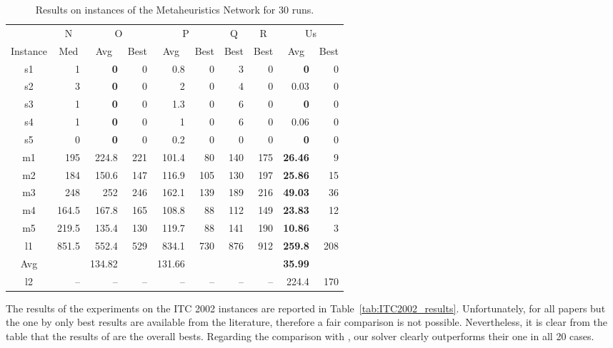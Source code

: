 \documentclass[authoryear,preprint,a4paper,12pt]{elsarticle}
\begin{document}
\begin{table}
\centering
\footnotesize
\begin{tabular}{|c|r|rr|rr|r|r|rr|}\hline
 & \multicolumn{1}{c|}{N} & \multicolumn{ 2}{c|}{O} & \multicolumn{ 2}{c|}{P} & \multicolumn{1}{c|}{Q} & \multicolumn{1}{c|}{R} & \multicolumn{ 2}{c|}{Us} \\ 
Instance & \multicolumn{1}{c|}{Med} & \multicolumn{1}{c}{Avg} & \multicolumn{1}{c|}{Best} & \multicolumn{1}{c}{Avg} & \multicolumn{1}{c|}{Best} & \multicolumn{1}{c|}{Best} & \multicolumn{1}{c|}{Best} & \multicolumn{1}{c}{Avg} & \multicolumn{1}{c|}{Best} \\ 
\hline
    s1  & 1 & \textbf{0} & 0 & 0.8 & 0 & 3 & 0 & \textbf{0} & 0 \\ 
    s2  & 3 & \textbf{0} & 0 & 2 & 0 & 4 & 0 & 0.03 & 0 \\ 
    s3  & 1 & \textbf{0} & 0 & 1.3 & 0 & 6 & 0 & \textbf{0} & 0 \\ 
    s4  & 1 & \textbf{0} & 0 & 1 & 0 & 6 & 0 & 0.06 & 0 \\ 
    s5  & 0 & \textbf{0} & 0 & 0.2 & 0 & 0 & 0 & \textbf{0} & 0 \\ 
    m1  & 195 & 224.8 & 221 & 101.4 & 80 & 140 & 175 & \textbf{26.46} & 9 \\ 
    m2  & 184 & 150.6 & 147 & 116.9 & 105 & 130 & 197 & \textbf{25.86} & 15 \\ 
    m3  & 248 & 252 & 246 & 162.1 & 139 & 189 & 216 & \textbf{49.03} & 36 \\ 
    m4  & 164.5 & 167.8 & 165 & 108.8 & 88 & 112 & 149 & \textbf{23.83} & 12 \\ 
    m5  & 219.5 & 135.4 & 130 & 119.7 & 88 & 141 & 190 & \textbf{10.86} & 3 \\ 
    l1  & 851.5 & 552.4 & 529 & 834.1 & 730 & 876 & 912 & \textbf{259.8} & 208 \\     \hline

    Avg & & 134.82 & & 131.66 & & & &  \textbf{35.99} & \\     \hline
    l2  & --  & --  &  -- & --  & --  & --  & -- & 224.4 & 170 \\ 
    \hline
\end{tabular}
 
   \caption{Results on instances of the Metaheuristics Network for 30 runs.}
  \label{tab:socha_results}
\end{table}


The results of the experiments on the ITC 2002 instances are reported
in Table~\ref{tab:ITC2002_results}. Unfortunately, for all papers but
the one by \citeauthor{MNCR08} only best results are available from
the literature, therefore a fair comparison is not possible.
Nevertheless, it is clear from the table that the results of
\citeauthor{Kost04} are the overall bests. Regarding the comparison
with \citeauthor{MNCR08}, our solver clearly outperforms their one in
all 20 cases.
\end{document}
